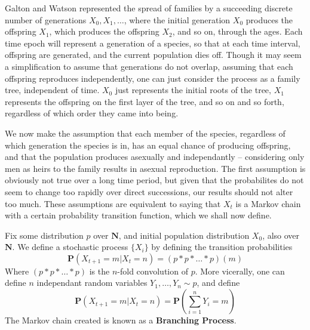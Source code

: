 Galton and Watson represented the spread of families by a succeeding discrete number of generations $X_0, X_1, \dots$, where the initial generation $X_0$ produces the offspring $X_1$, which produces the offspring $X_2$, and so on, through the ages. Each time epoch will represent a generation of a species, so that at each time interval, offspring are generated, and the current population dies off. Though it may seem a simplification to assume that generations do not overlap, assuming that each offspring reproduces independently, one can just consider the process as a family tree, independent of time. $X_0$ just represents the initial roots of the tree, $X_1$ represents the offspring on the first layer of the tree, and so on and so forth, regardless of which order they came into being.

We now make the assumption that each member of the species, regardless of which generation the species is in, has an equal chance of producing offspring, and that the population produces asexually and independantly -- considering only men as heirs to the family results in asexual reproduction. The first assumption is obviously not true over a long time period, but given that the probabilites do not seem to change too rapidly over direct successions, our results should not alter too much. These assumptions are equivalent to saying that $X_t$ is a Markov chain with a certain probability transition function, which we shall now define.

\begin{definition}
    Fix some distribution $p$ over $\mathbf{N}$, and initial population distribution $X_0$, also over $\mathbf{N}$. We define a stochastic process $\{ X_i \}$ by defining the transition probabilities
    \begin{equation} \label{branch1} \mathbf{P}(X_{t+1} = m | X_t = n) = (p * p * \dots * p)(m) \end{equation}
    Where $(p * p * \dots * p)$ is the $n$-fold convolution of $p$. More vicerally, one can define $n$ independant random variables $Y_1, \dots, Y_n \sim p$, and define
    \begin{equation} \label{branch2} \mathbf{P}(X_{t+1} = m | X_t = n) = \mathbf{P}\left( \sum_{i = 1}^n Y_i = m \right) \end{equation}
    The Markov chain created is known as a {\bf Branching Process}.
\end{definition}

